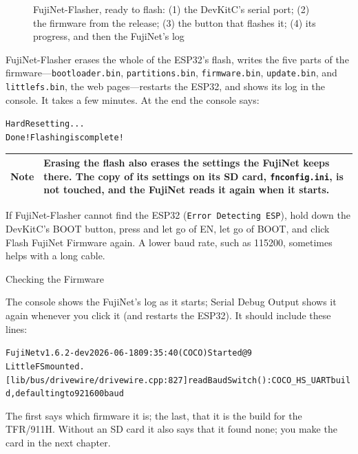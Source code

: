 \documentclass[10pt,twoside,openany]{book}
\makeatletter
\newcommand{\file}[1]{\texttt{#1}}           %
\newcommand{\key}[1]{\textsf{\small #1}}     %
\newenvironment{exsmall}{\par\vspace{0.3ex}\scriptsize\begin{alltt}}{\end{alltt}\vspace{0.3ex}}
\newcommand{\notice}[2]{\par\vspace{0.8ex}\noindent
  \begin{tabularx}{\linewidth}{@{}>{\sffamily\bfseries}p{0.85in}X@{}}
  \toprule #1 & #2\\ \bottomrule\end{tabularx}\par\vspace{0.6ex}}
\newcommand{\note}[1]{\notice{Note}{#1}}
\renewcommand{\section}{\@startsection{section}{1}{0pt}{3.2ex plus 1ex}{1.2ex}%
  {\sffamily\bfseries\large}}
\makeatother
\begin{document}
\begin{figure}[htbp]
\caption{FujiNet-Flasher, ready to flash: (1) the DevKitC's serial port; (2)
the firmware from the release; (3) the button that flashes it; (4) its
progress, and then the FujiNet's log}\label{fig:flasher}
\end{figure}

FujiNet-Flasher erases the whole of the ESP32's flash, writes the five
parts of the firmware---\file{bootloader.bin}, \file{partitions.bin},
\file{firmware.bin}, \file{update.bin}, and \file{littlefs.bin}, the web
pages---restarts the ESP32, and shows its log in the console. It takes a
few minutes. At the end the console says:
\begin{exsmall}
Hard Resetting...
Done! Flashing is complete!
\end{exsmall}

\note{Erasing the flash also erases the settings the FujiNet keeps there.
The copy of its settings on its SD card, \file{fnconfig.ini}, is not
touched, and the FujiNet reads it again when it starts.}

If FujiNet-Flasher cannot find the ESP32 (\texttt{Error Detecting ESP}),
hold down the DevKitC's \key{BOOT} button, press and let go of \key{EN},
let go of \key{BOOT}, and click \key{Flash FujiNet Firmware} again. A
lower baud rate, such as 115200, sometimes helps with a long cable.

\section{Checking the Firmware}

The console shows the FujiNet's log as it starts; \key{Serial Debug
Output} shows it again whenever you click it (and restarts the ESP32). It
should include these lines:
\begin{exsmall}
FujiNet v1.6.2-dev 2026-06-18 09:35:40 (COCO) Started @ 9
LittleFS mounted.
[lib/bus/drivewire/drivewire.cpp:827] readBaudSwitch(): COCO_HS_UART build, defaulting to 921600 baud
\end{exsmall}
The first says which firmware it is; the last, that it is the build for
the TFR/911H. Without an SD card it also says that it found none; you
make the card in the next chapter.
\end{document}
